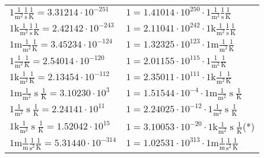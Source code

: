 \begin{center}
\begin{longtable}{l l}
{\color{black}$1 \bm{\mathrm{ }}\frac1{\operatorname{m}^2}\frac1{\operatorname{s}}{}\frac1{\operatorname{K}} = 3.31214\cdot10^{-251} $}   & {\color{black}$ 1 = 1.41014\cdot10^{250} \cdot 1 \bm{\mathrm{ }}\frac1{\operatorname{m}^2}\frac1{\operatorname{s}}{}\frac1{\operatorname{K}}$}  \\
{\color{gray}$1 \bm{\mathrm{ k}}\frac1{\operatorname{m}^2}\frac1{\operatorname{s}}{}\frac1{\operatorname{K}} = 2.42142\cdot10^{-243} $}   & {\color{gray}$ 1 = 2.11041\cdot10^{242} \cdot 1 \bm{\mathrm{ k}}\frac1{\operatorname{m}^2}\frac1{\operatorname{s}}{}\frac1{\operatorname{K}}$}  \\
{\color{gray}$1 \bm{\mathrm{ m}}\frac1{\operatorname{m}^2}{}{}\frac1{\operatorname{K}} = 3.45234\cdot10^{-124} $}   & {\color{gray}$ 1 = 1.32325\cdot10^{123} \cdot 1 \bm{\mathrm{ m}}\frac1{\operatorname{m}^2}{}{}\frac1{\operatorname{K}}$}  \\
{\color{black}$1 \bm{\mathrm{ }}\frac1{\operatorname{m}^2}{}{}\frac1{\operatorname{K}} = 2.54014\cdot10^{-120} $}   & {\color{black}$ 1 = 2.01155\cdot10^{115} \cdot 1 \bm{\mathrm{ }}\frac1{\operatorname{m}^2}{}{}\frac1{\operatorname{K}}$}  \\
{\color{gray}$1 \bm{\mathrm{ k}}\frac1{\operatorname{m}^2}{}{}\frac1{\operatorname{K}} = 2.13454\cdot10^{-112} $}   & {\color{gray}$ 1 = 2.35011\cdot10^{111} \cdot 1 \bm{\mathrm{ k}}\frac1{\operatorname{m}^2}{}{}\frac1{\operatorname{K}}$}  \\
{\color{gray}$1 \bm{\mathrm{ m}}\frac1{\operatorname{m}^2}{\operatorname{s}}{}\frac1{\operatorname{K}} = 3.10230\cdot10^{3} $}   & {\color{gray}$ 1 = 1.51544\cdot10^{-4} \cdot 1 \bm{\mathrm{ m}}\frac1{\operatorname{m}^2}{\operatorname{s}}{}\frac1{\operatorname{K}}$}  \\
{\color{black}$1 \bm{\mathrm{ }}\frac1{\operatorname{m}^2}{\operatorname{s}}{}\frac1{\operatorname{K}} = 2.24141\cdot10^{11} $}   & {\color{black}$ 1 = 2.24025\cdot10^{-12} \cdot 1 \bm{\mathrm{ }}\frac1{\operatorname{m}^2}{\operatorname{s}}{}\frac1{\operatorname{K}}$}  \\
{\color{gray}$1 \bm{\mathrm{ k}}\frac1{\operatorname{m}^2}{\operatorname{s}}{}\frac1{\operatorname{K}} = 1.52042\cdot10^{15} $}   & {\color{gray}$ 1 = 3.10053\cdot10^{-20} \cdot 1 \bm{\mathrm{ k}}\frac1{\operatorname{m}^2}{\operatorname{s}}{}\frac1{\operatorname{K}}$}\quad(*)\\
{\color{gray}$1 \bm{\mathrm{ m}}\frac1{\operatorname{m}}\frac1{\operatorname{s}^2}{}\frac1{\operatorname{K}} = 5.31440\cdot10^{-314} $}   & {\color{gray}$ 1 = 1.02531\cdot10^{313} \cdot 1 \bm{\mathrm{ m}}\frac1{\operatorname{m}}\frac1{\operatorname{s}^2}{}\frac1{\operatorname{K}}$}  \\

\end{longtable}
\end{center}
